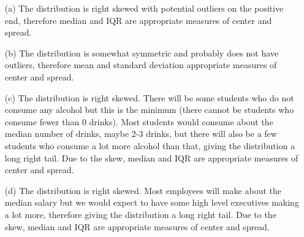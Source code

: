 {
\begin{enumerate}
\item[(a)] The distribution is right skewed with potential outliers on the positive end, therefore median and IQR are appropriate measures of center and spread.
\item[(b)] The distribution is somewhat symmetric and probably does not have outliers, therefore mean and standard deviation appropriate measures of center and spread.
\item[(c)] The distribution is right skewed. There will be some students who do not consume any alcohol but this is the minimum (there cannot be students who consume fewer than 0 drinks). Most students would consume about the median number of drinks, maybe 2-3 drinks, but there will also be a few students who consume a lot more alcohol than that, giving the distribution a long right tail. Due to the skew, median and IQR are appropriate measures of center and spread.
\item[(d)] The distribution is right skewed. Most employees will make about the median salary but we would expect to have some high level executives making a lot more, therefore giving the distribution a long right tail. Due to the skew, median and IQR are appropriate measures of center and spread.
\end{enumerate}
}

%

